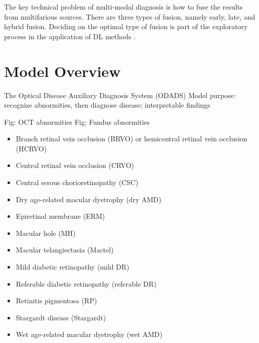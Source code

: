 \documentclass{article}
\begin{document}
		The key technical problem of multi-modal diagnosis is how to fuse the results from multifarious sources.  There are three types of fusion, namely early, late, and hybrid fusion.  Deciding on the optimal type of fusion is part of the exploratory process in the application of DL methods \autocite{Ichhpujani_Thakur_2021}.
		
		
	
	\section{Model Overview}
		
		The Optical Disease Auxiliary Diagnosis System (ODADS)
		Model purpose: recognize abnormities, then diagnose disease; 
		interpretable findings 
		
		
		
		Fig: OCT abnormities
		Fig: Fundus abnormities
		
		\begin{itemize}
			\item Branch retinal vein occlusion (BRVO) or hemicentral retinal vein occlusion (HCRVO)
			
			\item Central retinal vein occlusion (CRVO)
			
			\item Central serous chorioretinopathy (CSC)
			
			\item Dry age-related macular dystrophy (dry AMD)
			
			\item Epiretinal membrane (ERM)
			
			\item Macular hole (MH)
			
			\item Macular telangiectasia (Mactel)
			
			\item Mild diabetic retinopathy (mild DR)
			
			\item Referable diabetic retinopathy (referable DR)
			
			\item Retinitis pigmentosa (RP)
			
			\item Stargardt disease (Stargardt)
			
			\item Wet age-related macular dystrophy (wet AMD)
		\end{itemize}
		
\end{document}
